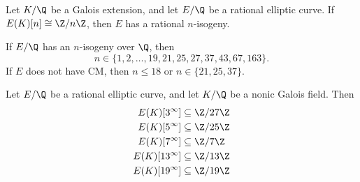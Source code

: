 \begin{frame}[plain]
\begin{lem}
Let $K/\Q$ be a Galois extension, and let $E/\Q$ be a rational elliptic curve. If $E(K)[n] \cong \Z/n\Z$, then $E$ has a rational $n$-isogeny. 
\end{lem}
\end{frame}



\begin{frame}[plain]
	\begin{thm}
	If $E/\Q$ has an $n$-isogeny over $\Q$, then 
		\[
		n \in \{1,2,\ldots,19,21,25,27,37,43,67,163\}. 
		\]
	If $E$ does not have CM, then $n \leq 18$ or $n \in \{21,25,37\}$. 
	\end{thm}
\end{frame}



\begin{frame}[plain]
\begin{lem}
Let $E/\Q$ be a rational elliptic curve, and let $K/\Q$ be a nonic Galois field. Then
	\[
	\begin{aligned}
	E(K)[3^\infty]&\subseteq \Z/27\Z \\
	E(K)[5^\infty]&\subseteq \Z/25\Z \\
	E(K)[7^\infty]&\subseteq \Z/7\Z \\
	E(K)[13^\infty]&\subseteq \Z/13\Z \\
	E(K)[19^\infty]&\subseteq \Z/19\Z
	\end{aligned}
	\]
\end{lem}
\end{frame}



